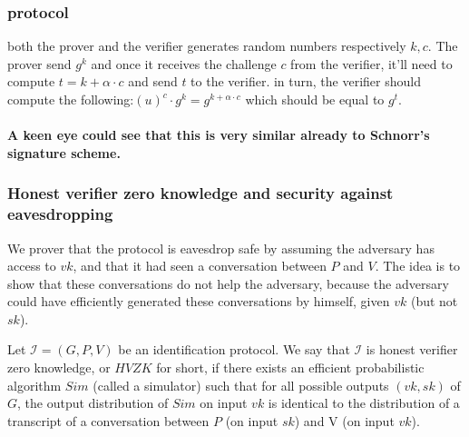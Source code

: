 \subsubsection{protocol}

both the prover and the verifier generates random numbers respectively
$k,c$. The prover send $g^{k}$ and once it receives the challenge
$c$ from the verifier, it'll need to compute $t=k+\alpha\cdot c$
and send $t$ to the verifier. in turn, the verifier should compute
the following:$\left(u\right)^{c}\cdot g^{k}=g^{k+\alpha\cdot c}$
which should be equal to $g^{t}$.

\paragraph{A keen eye could see that this is very similar already to Schnorr's
signature scheme.}

\subsubsection{Honest verifier zero knowledge and security against eavesdropping}

We prover that the protocol is eavesdrop safe by assuming the adversary
has access to $vk$, and that it had seen a conversation between $P$
and $V$. The idea is to show that these conversations do not help
the adversary, because the adversary could have efficiently generated
these conversations by himself, given $vk$ (but not $sk$).
\begin{defn}
Let $\mathcal{I}=(G,P,V)$ be an identification protocol. We say that
$\mathcal{I}$ is honest verifier zero knowledge, or $HVZK$ for short,
if there exists an efficient probabilistic algorithm $Sim$ (called
a simulator) such that for all possible outputs $(vk,sk)$ of $G$,
the output distribution of $Sim$ on input $vk$ is identical to the
distribution of a transcript of a conversation between $P$ (on input
$sk$) and V (on input $vk$).
\end{defn}


